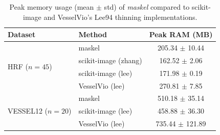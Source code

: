 \begin{table}[t]
\centering
\begin{tabular}{llc}
\toprule
Dataset & Method & Peak RAM (MB) \\
\midrule
\multirow{4}{*}{HRF ($n=45$)} & maskel & 205.34 $\pm$ 10.44 \\
 & scikit-image (zhang) & 162.52 $\pm$ 2.06 \\
 & scikit-image (lee) & 171.98 $\pm$ 0.19 \\
 & VesselVio (lee) & 270.81 $\pm$ 7.85 \\
\midrule
\multirow{3}{*}{VESSEL12 ($n=20$)} & maskel & 510.18 $\pm$ 35.14 \\
 & scikit-image (lee) & 458.88 $\pm$ 36.30 \\
 & VesselVio (lee) & 735.44 $\pm$ 121.89 \\
\bottomrule
\end{tabular}
\caption{Peak memory usage (mean $\pm$ std) of \emph{maskel} compared to scikit-image and VesselVio's Lee94 thinning implementations.}
\label{tab:benchmark-memory}
\end{table}
